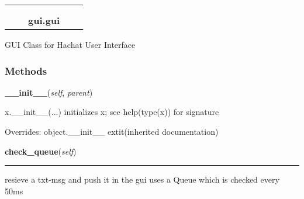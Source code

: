     \label{gui:gui}
\begin{tabular}{cccccc}
\multicolumn{2}{r}{\settowidth{\BCL}{object}\multirow{2}{\BCL}{object}}
&&
  \\\cline{3-3}
  &&\multicolumn{1}{c|}{}
&&
  \\
&&\multicolumn{2}{l}{\textbf{gui.gui}}
\end{tabular}

GUI Class for Hachat User Interface



  \subsubsection{Methods}

    \vspace{0.5ex}

\hspace{.8\funcindent}\begin{boxedminipage}{\funcwidth}

    \raggedright \textbf{\_\_init\_\_}(\textit{self}, \textit{parent})

\setlength{\parskip}{2ex}
    x.\_\_init\_\_(...) initializes x; see help(type(x)) for signature

\setlength{\parskip}{1ex}
      Overrides: object.\_\_init\_\_ 	extit{(inherited documentation)}

    \end{boxedminipage}

    \label{gui:gui:check_queue}

    \vspace{0.5ex}

\hspace{.8\funcindent}\begin{boxedminipage}{\funcwidth}

    \raggedright \textbf{check\_queue}(\textit{self})

    \vspace{-1.5ex}

    \rule{\textwidth}{0.5\fboxrule}
\setlength{\parskip}{2ex}
    resieve a txt-msg and push it in the gui uses a Queue which is checked 
    every 50ms

\setlength{\parskip}{1ex}
    \end{boxedminipage}

